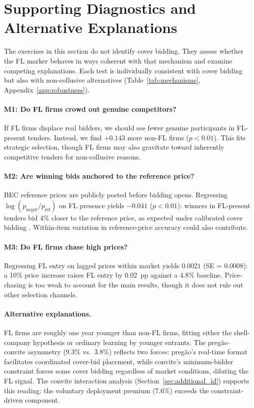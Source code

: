 \section{Supporting Diagnostics and Alternative Explanations}
\label{sec:mechanisms}

The exercises in this section do not identify cover bidding. They
assess whether the FL marker behaves in ways coherent with that
mechanism and examine competing explanations. Each test is
individually consistent with cover bidding but also with
non-collusive alternatives (Table~\ref{tab:mechanisms},
Appendix~\ref{app:robustness}).

\paragraph{M1: Do FL firms crowd out genuine competitors?}
If FL firms displace real bidders, we should see fewer genuine
participants in FL-present tenders. Instead, we find $+0.143$ more
non-FL firms ($p < 0.01$). This fits strategic selection, though FL
firms may also gravitate toward inherently competitive tenders for
non-collusive reasons.

\paragraph{M2: Are winning bids anchored to the reference price?}
BEC reference prices are publicly posted before bidding opens.
Regressing $\log(p_{\text{negot}} / p_{\text{ref}})$ on FL presence
yields $-0.041$ ($p < 0.01$): winners in FL-present tenders bid 4\%
closer to the reference price, as expected under calibrated cover
bidding \citep{marshall2012economics}. Within-item variation in
reference-price accuracy could also contribute.

\paragraph{M3: Do FL firms chase high prices?}
Regressing FL entry on lagged prices within market yields $0.0021$
(SE = 0.0008): a 10\% price increase raises FL entry by 0.02~pp
against a 4.8\% baseline. Price-chasing is too weak to account for
the main results, though it does not rule out other selection
channels.

\paragraph{Alternative explanations.}
FL firms are roughly one year younger than non-FL firms, fitting
either the shell-company hypothesis or ordinary learning by younger
entrants. The preg\~ao--convite asymmetry (9.3\% vs.\ 3.8\%) reflects
two forces: preg\~ao's real-time format facilitates coordinated
cover-bid placement, while convite's minimum-bidder constraint forces
some cover bidding regardless of market conditions, diluting the FL
signal. The convite interaction analysis
(Section~\ref{sec:additional_id}) supports this reading: the voluntary
deployment premium (7.6\%) exceeds the constraint-driven component.

